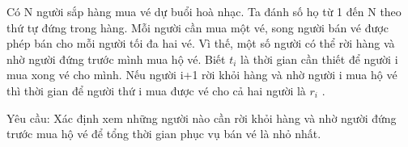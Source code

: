 Có N người sắp hàng mua vé dự buổi hoà nhạc. Ta đánh số họ từ 1 đến N theo thứ tự   đứng trong hàng. Mỗi người cần mua một vé, song người bán vé được phép bán cho mỗi   người tối đa hai vé. Vì thế, một số người có thể rời hàng và nhờ người đứng trước mình mua   hộ vé. Biết $t_{i}$   là thời gian cần thiết để người i mua xong vé cho mình. Nếu người   i+1 rời khỏi hàng và nhờ người i mua hộ vé thì thời gian để người thứ i mua được vé cho cả   hai người là $r_{i}$   .  

   Yêu cầu: Xác định xem những người nào cần rời khỏi hàng và nhờ người đứng trước mua   hộ vé để tổng thời gian phục vụ bán vé là nhỏ nhất.